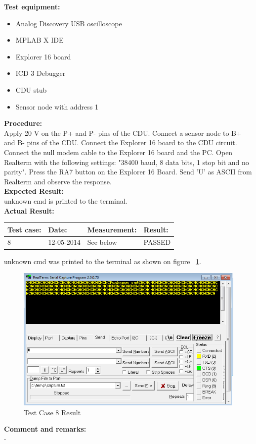 \textbf{Test equipment:}
\begin{itemize}
\item Analog Discovery USB oscilloscope
\item MPLAB X IDE
\item Explorer 16 board
\item ICD 3 Debugger
\item CDU stub
\item Sensor node with address 1
\end{itemize}

\textbf{Procedure:}\\
Apply 20 V on the P+ and P- pins of the CDU. Connect a sensor node to B+ and B- pins of the CDU. Connect the Explorer 16 board to the CDU circuit. Connect the null modem cable to the Explorer 16 board and the PC. Open Realterm with the following settings: "38400 baud, 8 data bits, 1 stop bit and no parity". Press the RA7 button on the Explorer 16 Board. Send 'U' as ASCII from Realterm and observe the response.\\

\textbf{Expected Result:}\\
unknown cmd is printed to the terminal.\\

\textbf{Actual Result:}\\
\begin{table}[H]
\centering
\begin{tabular}{|p{2cm}|p{2cm}|p{3cm}|p{2cm}|}\hline
\textbf{Test case:} & \textbf{Date:} & \textbf{Measurement:} & \textbf{Result:} \\ \hline
8 & 12-05-2014 & See below & PASSED \\ \hline
\end{tabular}
\end{table}
unknown cmd was printed to the terminal as shown on figure ~\ref{fig:InteTestCase8}.
\begin{figure}[H]
\centering
\includegraphics[width=1\textwidth]{billeder/inte08}
\caption{Test Case 8 Result}
\label{fig:InteTestCase8}
\end{figure}

\textbf{Comment and remarks:}\\
-\\